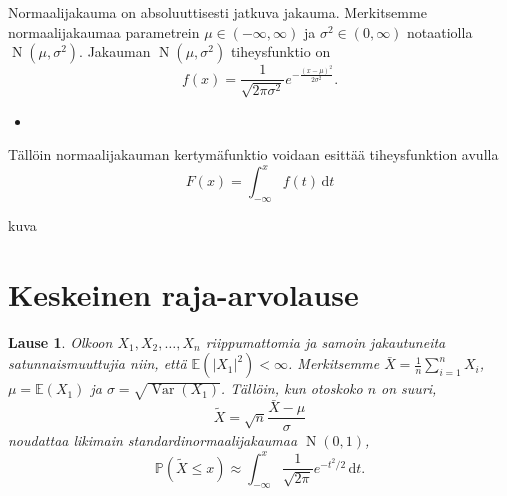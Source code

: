\documentclass{beamer}
\newtheorem{teoreema}{Lause}
\DeclareMathOperator{\var}{Var}
\DeclareMathOperator{\n}{\mathrm N}
\begin{document}
\begin{frame}
  Normaalijakauma on absoluuttisesti jatkuva jakauma. Merkitsemme
  normaalijakaumaa parametrein $\mu\in(-\infty, \infty)$ ja
  $\sigma^2\in(0,\infty)$ notaatiolla $\n\left(\mu, \sigma^2\right)$. Jakauman
  $\n\left(\mu, \sigma^2\right)$ tiheysfunktio on
  \begin{equation*}
    f(x) = \frac{1}{\sqrt{2\pi\sigma^2}} e^{-\frac{\left(x-\mu\right)^2}
    {2\sigma^2}}.
  \end{equation*}
  \pause
  \begin{itemize}
    \item[]
  \end{itemize}
  Tällöin normaalijakauman kertymäfunktio voidaan esittää tiheysfunktion avulla
  \begin{equation*}
    F\left(x\right) = \int_{-\infty}^{x} f(t)\,\mathrm{d}t
  \end{equation*}
\end{frame}


\begin{frame}
  kuva
\end{frame}


\section{Keskeinen raja-arvolause}


\begin{frame}
  \begin{teoreema}
    Olkoon $X_1, X_2, \ldots, X_n$ riippumattomia ja samoin jakautuneita
    satunnaismuuttujia niin, että $\mathbb{E}\left(\left|X_1\right|^2\right) <
    \infty$. Merkitsemme $\bar X = \frac{1}{n}\sum_{i = 1}^n X_i$, $\mu =
    \mathbb{E}\left(X_1\right)$ ja $\sigma = \sqrt{\var\left(X_1\right)}$.
    Tällöin, kun otoskoko $n$ on suuri,
    \begin{equation*}
      \tilde X = \sqrt{n}\frac{\bar X - \mu}{\sigma}
    \end{equation*}
    noudattaa likimain standardinormaalijakaumaa $\n\left(0, 1\right)$,
    \pause
    \begin{equation*}
      \mathbb{P}\left(\tilde X \leq x\right) \approx
      \int_{-\infty}^x \frac{1}{\sqrt{2\pi}}e^{-t^2/2}\,\mathrm{d}t.
    \end{equation*}
  \end{teoreema}
\end{frame}
\end{document}
